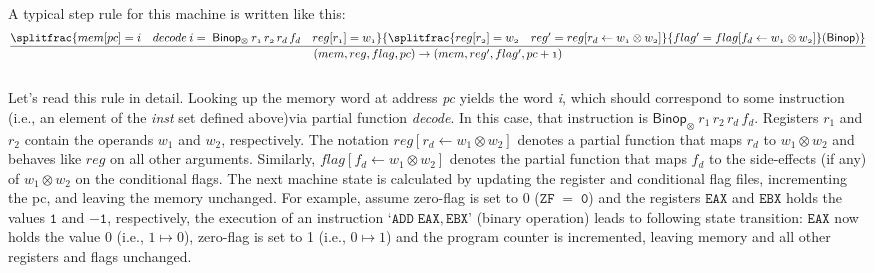 A typical step rule for this machine is written like this:
\\
\begin{equation*}
\begin{aligned}
\mathnormal{\frac{ \splitfrac{mem[pc]=i \quad decode \: i = \; \mathsf{Binop_\otimes} \: r_1\, r_2\, r_d\,f_d \quad reg[r_1]=w_1}{\splitfrac{reg[r_2]=w_2 \quad reg^\prime = reg[r_d \leftarrow w_1 \otimes w_2]}{flag^\prime = flag[f_d \leftarrow w_1 \otimes w_2]\hfill}\hfill \mathsf{(Binop)}}}{(mem, reg, flag, pc) \rightarrow (mem, reg^\prime, flag^\prime, pc+1)}}
\end{aligned}
\end{equation*}
\\
Let's read this rule in detail. Looking up the memory word at address \textit{pc} yields the word \textit{i}, which should correspond to some instruction (i.e., an element of the \textit{inst} set defined above)via  partial function \textit{decode}.  In this case, that instruction is $\mathsf{Binop_\otimes} \: r_1\, r_2\, r_d\, f_d$. Registers $r_1$ and $r_2$ contain the operands $w_1$ and $w_2$, respectively. The notation $reg[r_d \leftarrow w_1 \otimes w_2]$ denotes a partial function that maps $r_d$ to $w_1 \otimes w_2$ and behaves like $reg$ on all other arguments. Similarly, $flag[f_d \leftarrow w_1 \otimes w_2]$ denotes the partial function that maps $f_d$ to the side-effects (if any) of $w_1 \otimes w_2$ on the conditional flags. The next machine state is calculated by updating the register and conditional flag files, incrementing the pc, and leaving the memory unchanged. For example, assume zero-flag is set to 0 ($\mathtt{ZF\;=\;0}$) and the registers $\mathtt{EAX}$ and $\mathtt{EBX}$ holds the values $\mathtt{1}$ and $\mathtt{-1}$, respectively, the execution of an instruction `$\mathtt{ADD\;EAX, EBX}$' (binary operation) leads to following state transition: $\mathtt{EAX}$ now holds the value 0 (i.e., $1\mapsto0$), zero-flag is set to 1 (i.e., $0\mapsto1$) and the program counter is incremented, leaving memory and all other registers and flags unchanged.  

